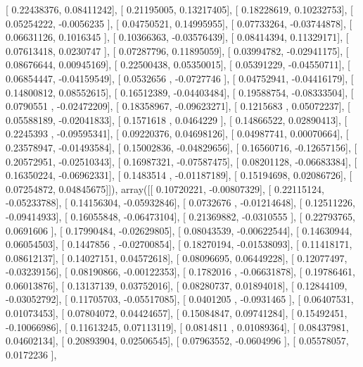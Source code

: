 \documentclass{article}
\begin{document}
       [ 0.22438376,  0.08411242],
       [ 0.21195005,  0.13217405],
       [ 0.18228619,  0.10232753],
       [ 0.05254222, -0.0056235 ],
       [ 0.04750521,  0.14995955],
       [ 0.07733264, -0.03744878],
       [ 0.06631126,  0.1016345 ],
       [ 0.10366363, -0.03576439],
       [ 0.08414394,  0.11329171],
       [ 0.07613418,  0.0230747 ],
       [ 0.07287796,  0.11895059],
       [ 0.03994782, -0.02941175],
       [ 0.08676644,  0.00945169],
       [ 0.22500438,  0.05350015],
       [ 0.05391229, -0.04550711],
       [ 0.06854447, -0.04159549],
       [ 0.0532656 , -0.0727746 ],
       [ 0.04752941, -0.04416179],
       [ 0.14800812,  0.08552615],
       [ 0.16512389, -0.04403484],
       [ 0.19588754, -0.08333504],
       [ 0.0790551 , -0.02472209],
       [ 0.18358967, -0.09623271],
       [ 0.1215683 ,  0.05072237],
       [ 0.05588189, -0.02041833],
       [ 0.1571618 ,  0.0464229 ],
       [ 0.14866522,  0.02890413],
       [ 0.2245393 , -0.09595341],
       [ 0.09220376,  0.04698126],
       [ 0.04987741,  0.00070664],
       [ 0.23578947, -0.01493584],
       [ 0.15002836, -0.04829656],
       [ 0.16560716, -0.12657156],
       [ 0.20572951, -0.02510343],
       [ 0.16987321, -0.07587475],
       [ 0.08201128, -0.06683384],
       [ 0.16350224, -0.06962331],
       [ 0.1483514 , -0.01187189],
       [ 0.15194698,  0.02086726],
       [ 0.07254872,  0.04845675]]), array([[ 0.10720221, -0.00807329],
       [ 0.22115124, -0.05233788],
       [ 0.14156304, -0.05932846],
       [ 0.0732676 , -0.01214648],
       [ 0.12511226, -0.09414933],
       [ 0.16055848, -0.06473104],
       [ 0.21369882, -0.0310555 ],
       [ 0.22793765,  0.0691606 ],
       [ 0.17990484, -0.02629805],
       [ 0.08043539, -0.00622544],
       [ 0.14630944,  0.06054503],
       [ 0.1447856 , -0.02700854],
       [ 0.18270194, -0.01538093],
       [ 0.11418171,  0.08612137],
       [ 0.14027151,  0.04572618],
       [ 0.08096695,  0.06449228],
       [ 0.12077497, -0.03239156],
       [ 0.08190866, -0.00122353],
       [ 0.1782016 , -0.06631878],
       [ 0.19786461,  0.06013876],
       [ 0.13137139,  0.03752016],
       [ 0.08280737,  0.01894018],
       [ 0.12844109, -0.03052792],
       [ 0.11705703, -0.05517085],
       [ 0.0401205 , -0.0931465 ],
       [ 0.06407531,  0.01073453],
       [ 0.07804072,  0.04424657],
       [ 0.15084847,  0.09741284],
       [ 0.15492451, -0.10066986],
       [ 0.11613245,  0.07113119],
       [ 0.0814811 ,  0.01089364],
       [ 0.08437981,  0.04602134],
       [ 0.20893904,  0.02506545],
       [ 0.07963552, -0.0604996 ],
       [ 0.05578057,  0.0172236 ],
\end{document}
